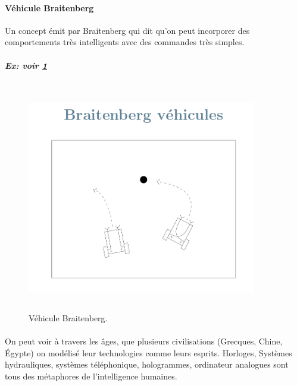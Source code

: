 \documentclass{book}
\begin{document}
\paragraph{Véhicule Braitenberg}
Un concept émit par Braitenberg qui dit qu'on peut incorporer des comportements très intelligents avec des commandes très simples.
\subparagraph{Ex: voir \ref{fig:Braitenberg}}
	\begin{figure}[!ht]
		\centering
		\includegraphics[width=10cm, height=10cm, keepaspectratio]{Braitenberg.png}
		\caption{Véhicule Braitenberg.}
		\label{fig:Braitenberg}
	\end{figure}
\paragraph{}	
On peut voir à travers les âges, que plusieurs civilisations (Grecques, Chine, Égypte) on modélisé leur technologies comme leurs esprits. Horloges, Systèmes hydrauliques, systèmes téléphonique, hologrammes, ordinateur analogues sont tous des métaphores de l'intelligence humaines.
\end{document}
